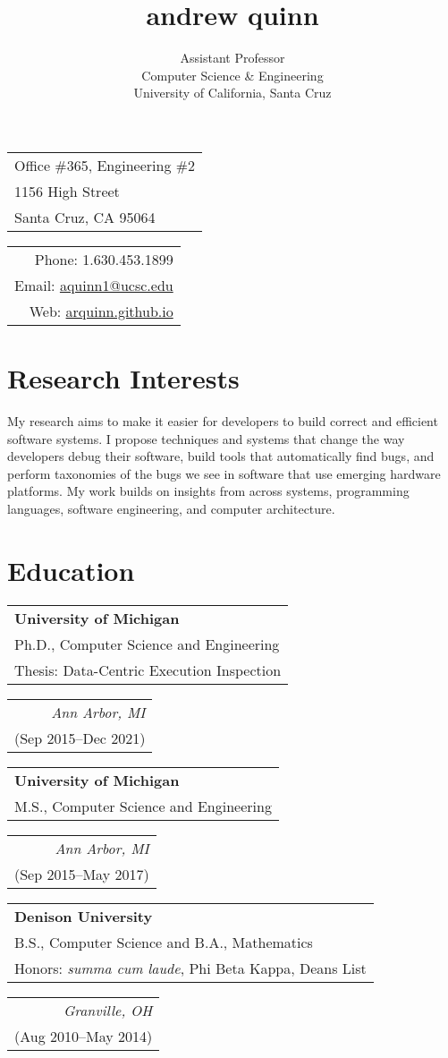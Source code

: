 \documentclass[letterpaper,10pt]{article}
\title{andrew quinn}
\author{Assistant Professor\\Computer Science \& Engineering\\ University of California, Santa Cruz}
\makeatletter
\newcommand{\reitem}[2]{
  \begin{tabular}[t]{l}
    #2
  \end{tabular}
\hfill
\begin{tabular}[t]{r}
  #1
\end{tabular}
}
\newcommand{\quadItem}[4]{\reitem{\emph{#1}\\#2}{\textbf{#3}\\#4}}
\def \addr {Office \#365, Engineering \#2\\1156 High Street\\Santa Cruz, CA 95064}
\def \phone {1.630.453.1899}
\def \email {\href{mailto:aquinn1@ucsc.edu}{aquinn1@ucsc.edu}}
\def \website {\href{https://arquinn.github.io}{arquinn.github.io}}
\makeatother
\begin{document}
\maketitle
\setlength\parindent{0pt}
\setlength{\parskip}{3pt}


\begin{tabular}[t]{l}
  \addr
\end{tabular}
\hfill
\begin{tabular}[t]{r}
  Phone: \phone\\
  Email: \email\\
  Web: \website
\end{tabular}


\section{Research Interests}
My research aims to make it easier for developers to build correct and
efficient software systems.  I propose techniques and systems that
change the way developers debug their software, build tools that
automatically find bugs, and perform taxonomies of the bugs we see in
software that use emerging hardware platforms.  My work builds on
insights from across systems, programming languages, software
engineering, and computer architecture.

\section{Education}

\quadItem{Ann Arbor, MI}{(Sep 2015--Dec 2021)}{University of
  Michigan}{Ph.D., Computer Science and Engineering\\Thesis:
  Data-Centric Execution Inspection}

\quadItem{Ann Arbor, MI}{(Sep 2015--May 2017)}{University of Michigan}{M.S.,
  Computer Science and Engineering}

\quadItem{Granville, OH}{(Aug 2010--May 2014)}{Denison University}{B.S.,
  Computer Science and B.A., Mathematics\\ Honors: \textit{summa cum
    laude}, Phi Beta Kappa, Deans List}
\end{document}

